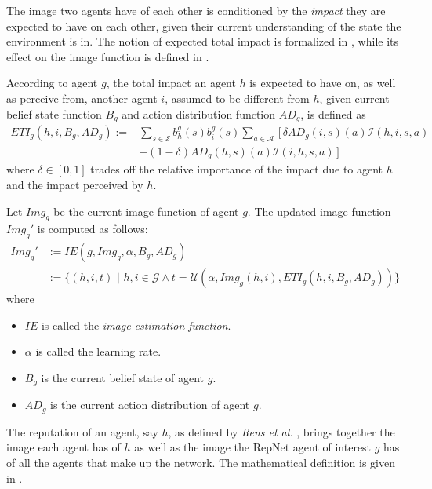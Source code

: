 The image two agents have of each other is conditioned by the \textit{impact} they are expected to have on each other, given their current understanding of the state the environment is in. The notion of expected total impact is formalized in , while its effect on the image function is defined in .
\begin{definition}
\label{def:imppo}
According to agent $g$, the total impact an agent $h$ is expected to have on, as well as perceive from, another agent $i$, assumed to be different from $h$, given current belief state function $B_g$ and action distribution function $AD_g$, is defined as
\begin{align*}
    ETI_{g} (h, i, B_g, AD_g) := &\sum_{s \in \mathcal{S}} b_h^g(s) b_i^g(s) \sum_{a \in \mathcal{A}} \, \big[ \, \delta AD_g(i, s)(a) \mathcal{I}(h, i, s, a)  \\&+ (1 - \delta) AD_g(h, s)(a) \mathcal{I}(i, h, s, a) \, \big]
\end{align*}
where $\delta \in [0,1]$ trades off the relative importance of the impact due to agent $h$ and the impact perceived by $h$.
\end{definition}


\begin{definition}
\label{def:imgb}
Let $Img_g$ be the current image function of agent $g$. The updated image function $Img_g'$ is computed as follows:
\begin{align*}
     Img_g' &:= IE(g,Img_g,\alpha, B_g, AD_g) \\&:= \Big\{(h,i, t) \,\,\Big| \,\,h,i \in \mathcal{G} \land t =  \mathcal{U}(\alpha, Img_g(h,i), ETI_{g}(h, i,B_g, AD_g)) \Big\}
\end{align*}
where
\begin{itemize}
    \item $IE$ is called the \textit{image estimation function}.
    \item $\alpha$ is called the learning rate.
    \item $B_g$ is the current belief state of agent $g$.
    \item $AD_g$ is the current action distribution of agent $g$.
\end{itemize}
\end{definition}

The reputation of an agent, say $h$, as defined by \textit{Rens et al.} \cite{rensetal}, brings together the image each agent has of $h$ as well as the image the RepNet agent of interest $g$ has of all the agents that make up the network. The mathematical definition is given in .

